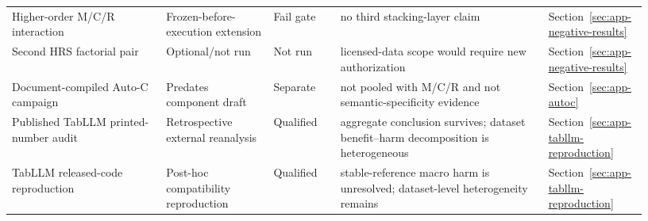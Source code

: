 \begin{longtable}{P{0.23\linewidth}P{0.16\linewidth}P{0.10\linewidth}P{0.31\linewidth}P{0.13\linewidth}}
Higher-order M/C/R interaction & Frozen-before-execution extension & Fail gate & no third stacking-layer claim & Section~\ref{sec:app-negative-results} \\
Second HRS factorial pair & Optional/not run & Not run & licensed-data scope would require new authorization & Section~\ref{sec:app-negative-results} \\
Document-compiled Auto-C campaign & Predates component draft & Separate & not pooled with M/C/R and not semantic-specificity evidence & Section~\ref{sec:app-autoc} \\
Published TabLLM printed-number audit & Retrospective external reanalysis & Qualified & aggregate conclusion survives; dataset benefit--harm decomposition is heterogeneous & Section~\ref{sec:app-tabllm-reproduction} \\
TabLLM released-code reproduction & Post-hoc compatibility reproduction & Qualified & stable-reference macro harm is unresolved; dataset-level heterogeneity remains & Section~\ref{sec:app-tabllm-reproduction} \\
\end{longtable}
